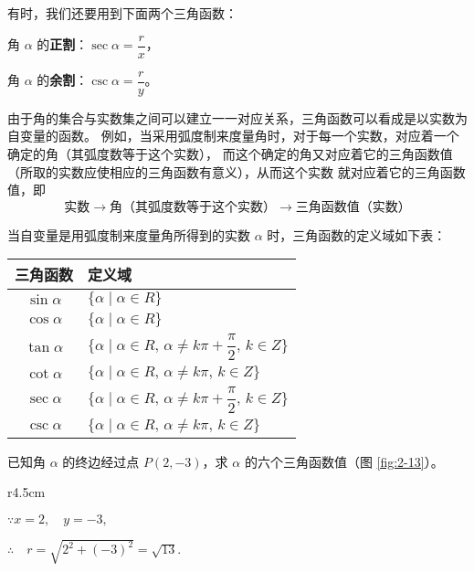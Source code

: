 有时，我们还要用到下面两个三角函数：

角 $\alpha$ 的\textbf{正割}：\quad $\sec \alpha = \dfrac r x$，
\vspace{0.5em}

角 $\alpha$ 的\textbf{余割}：\quad $\csc \alpha = \dfrac r y$。

由于角的集合与实数集之间可以建立一一对应关系，三角函数可以看成是以实数为自变量的函数。
例如，当采用弧度制来度量角时，对于每一个实数，对应着一个确定的角（其弧度数等于这个实数），
而这个确定的角又对应着它的三角函数值（所取的实数应使相应的三角函数有意义），从而这个实数
就对应着它的三角函数值，即
$$\text{实数} \to \text{角（其弧度数等于这个实数）} \to \text{三角函数值（实数）} $$

当自变量是用弧度制来度量角所得到的实数 $\alpha$ 时，三角函数的定义域如下表：

\begin{table}[h]
\centering
\begin{tabular}{|c|l|}
    \hline
    三角函数 & 定义域 \\ \hline
    $\sin \alpha$ & $\{\alpha \mid \alpha \in R\}$  \\ \hline
    $\cos \alpha$ & $\{\alpha \mid \alpha \in R\}$  \\ \hline
    \rule{0pt}{1.5em}$\tan \alpha$ & $\{\alpha \mid \alpha \in R, \, \alpha \neq k\pi + \dfrac \pi 2, \, k \in Z\}$  \\ \hline
    $\cot \alpha$ & $\{\alpha \mid \alpha \in R, \, \alpha \neq k\pi, \, k \in Z\}$  \\ \hline
    \rule{0pt}{1.5em}$\sec \alpha$ & $\{\alpha \mid \alpha \in R, \, \alpha \neq k\pi + \dfrac \pi 2, \, k \in Z\}$  \\ \hline
    $\csc \alpha$ & $\{\alpha \mid \alpha \in R, \, \alpha \neq k\pi, \, k \in Z\}$  \\ \hline
\end{tabular}
\end{table}

\liti 已知角 $\alpha$ 的终边经过点 $P(2, -3)$，求 $\alpha$ 的六个三角函数值（图 \ref{fig:2-13}）。

\begin{wrapfigure}[8]{r}{4.5cm}
    \centering
    
    \vspace{-20pt}
    \caption{}\label{fig:2-13}
\end{wrapfigure}

\jie $\because x = 2, \quad y = -3,$

$\therefore \quad r = \sqrt{2^2 + (-3)^2} = \sqrt{13}.$

